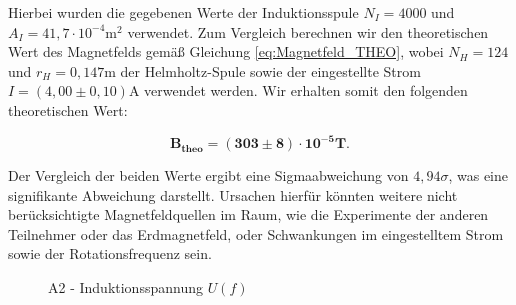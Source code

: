 \documentclass{article}
\begin{document}
Hierbei wurden die gegebenen Werte der Induktionsspule $N_I = 4000$ und $A_I = 41,7 \cdot 10^{-4}$m$^2$ verwendet. Zum Vergleich berechnen wir den theoretischen Wert des Magnetfelds gemäß Gleichung \ref{eq:Magnetfeld_THEO}, wobei $N_H = 124$ und $r_H = 0,147$m der Helmholtz-Spule sowie der eingestellte Strom $I = (4,00 \pm 0,10)$A verwendet werden. Wir erhalten somit den folgenden theoretischen Wert:

\begin{equation}
    \bm{B_{theo} = (303 \pm 8)\cdot 10^{-5}} \textbf{T}.
\end{equation}

Der Vergleich der beiden Werte ergibt eine Sigmaabweichung von $4,94 \sigma$, was eine signifikante Abweichung darstellt. Ursachen hierfür könnten weitere nicht berücksichtigte Magnetfeldquellen im Raum, wie die Experimente der anderen Teilnehmer oder das Erdmagnetfeld, oder Schwankungen im eingestelltem Strom sowie der Rotationsfrequenz sein.  

\begin{figure}[!h]
    \centering
    \caption{A2 - Induktionsspannung $U(f)$}
    \label{fig:A2-U(f)}
\end{figure}
\end{document}
